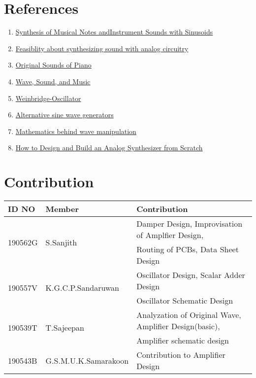 \section*{References}
\begin{enumerate}
    \item \href{https://web.eecs.utk.edu/~hqi/ece505/project/proj1.pdf}{Synthesis of Musical Notes andInstrument Sounds with Sinusoids}
    \item \href{https://electronics.stackexchange.com/questions/178975/is-it-feasible-to-synthesise-sound-with-analog-circuitry-these-days}{Feasiblity about synthesizing sound with analog
              circuitry}
    \item \href{http://www.vibrationdata.com/piano.htm}{Original Sounds of Piano}
    \item \href{https://universe-review.ca/R12-03-wave02.htm}{Wave, Sound, and Music}
    \item  \href{https://en.wikipedia.org/wiki/Wien_bridge_oscillator}{Weinbridge-Oscillator}
    \item \href{https://www.homemade-circuits.com/simple-sine-wave-generator-circuits/}{Alternative sine wave generators}
    \item \href{https://www.ams.jhu.edu/dan-mathofmusic/sound-waves/}{Mathematics behind wave manipulation}
    \item \href{http://www.jiisuki.net/reports/howto-build-analog-synth.pdf}{How to Design and Build an Analog Synthesizer from Scratch}
\end{enumerate}
\vspace*{5cm}
\section*{Contribution}
\begin{tabular}{|l|l|l|}
    \toprule
    ID NO                    & Member                              & Contribution                                           \\
    \midrule\midrule
    \multirow{2}{*}{190562G} & \multirow{2}{*}{S.Sanjith}          & Damper Design, Improvisation of Amplfier Design,       \\
                             &                                     & Routing of PCBs, Data Sheet Design                     \\
    \midrule
    \multirow{2}{*}{190557V} & \multirow{2}{*}{K.G.C.P.Sandaruwan} & Oscillator Design, Scalar Adder Design                 \\
                             &                                     & Oscillator Schematic Design                            \\
    \midrule
    \multirow{2}{*}{190539T} & \multirow{2}{*}{T.Sajeepan}         & Analyzation of Original Wave, Amplifier Design(basic), \\
                             &                                     & Amplifier schematic design                             \\
    \midrule
    190543B                  & G.S.M.U.K.Samarakoon                & Contribution to Amplifier Design                         \\
    \bottomrule
\end{tabular}